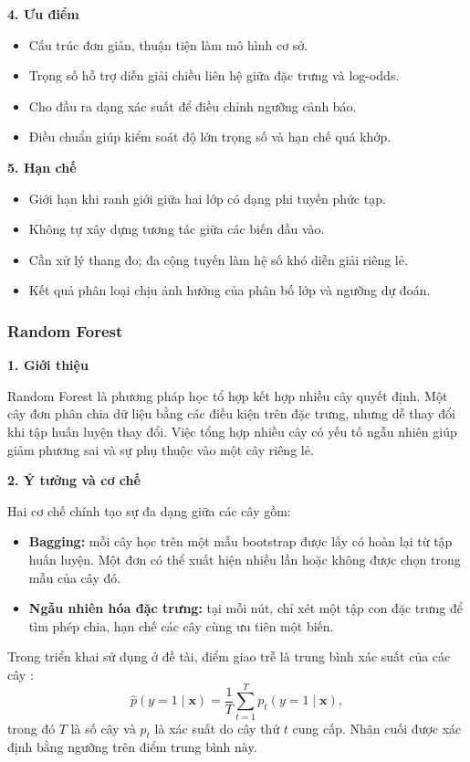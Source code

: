 \documentclass[a4paper]{article}
\begin{document}
\noindent\textbf{4. Ưu điểm}\par
\begin{itemize}
    \item Cấu trúc đơn giản, thuận tiện làm mô hình cơ sở.
    \item Trọng số hỗ trợ diễn giải chiều liên hệ giữa đặc trưng và log-odds.
    \item Cho đầu ra dạng xác suất để điều chỉnh ngưỡng cảnh báo.
    \item Điều chuẩn giúp kiểm soát độ lớn trọng số và hạn chế quá khớp.
\end{itemize}

\noindent\textbf{5. Hạn chế}\par
\begin{itemize}
    \item Giới hạn khi ranh giới giữa hai lớp có dạng phi tuyến phức tạp.
    \item Không tự xây dựng tương tác giữa các biến đầu vào.
    \item Cần xử lý thang đo; đa cộng tuyến làm hệ số khó diễn giải riêng lẻ.
    \item Kết quả phân loại chịu ảnh hưởng của phân bố lớp và ngưỡng dự đoán.
\end{itemize}



\subsubsection{Random Forest}
\noindent\textbf{1. Giới thiệu}\par
Random Forest là phương pháp học tổ hợp kết hợp nhiều cây quyết định. Một cây đơn phân chia dữ liệu bằng các điều kiện trên đặc trưng, nhưng dễ thay đổi khi tập huấn luyện thay đổi. Việc tổng hợp nhiều cây có yếu tố ngẫu nhiên giúp giảm phương sai và sự phụ thuộc vào một cây riêng lẻ.

\noindent\textbf{2. Ý tưởng và cơ chế}\par
Hai cơ chế chính tạo sự đa dạng giữa các cây gồm:
\begin{itemize}
    \item \textbf{Bagging:} mỗi cây học trên một mẫu bootstrap được lấy có hoàn lại từ tập huấn luyện. Một đơn có thể xuất hiện nhiều lần hoặc không được chọn trong mẫu của cây đó.
    \item \textbf{Ngẫu nhiên hóa đặc trưng:} tại mỗi nút, chỉ xét một tập con đặc trưng để tìm phép chia, hạn chế các cây cùng ưu tiên một biến.
\end{itemize}
Trong triển khai sử dụng ở đề tài, điểm giao trễ là trung bình xác suất của các cây \cite{forestTheory}:
\[
\widehat{p}(y=1\mid\mathbf{x})=\frac{1}{T}\sum_{t=1}^{T}p_t(y=1\mid\mathbf{x}),
\]
trong đó $T$ là số cây và $p_t$ là xác suất do cây thứ $t$ cung cấp. Nhãn cuối được xác định bằng ngưỡng trên điểm trung bình này.
\end{document}
